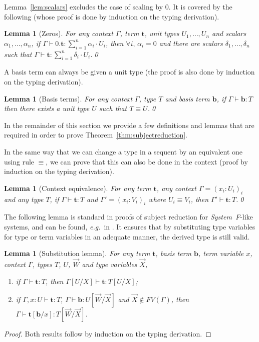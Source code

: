 \documentclass[colorlinks=true,linkcolor=black,urlcolor=black,citecolor=blue,submission,copyright,creativecommons]{eptcs}
\newtheorem{lemma}[theorem]{Lemma}
\newcommand{\eg}{\emph{e.g.}~}
\newcommand{\ve}[1]{\mathrm{\textbf{#1}}}
\newcommand{\type}{\colon\!}
\newcommand{\sui}[1]{\sum_{i=1}^{#1}}
\begin{document}
Lemma~\ref{lem:scalars} excludes the case of scaling by $0$. It is
covered by the following (whose proof is done by induction on the
typing derivation).

\begin{lemma}[Zeros]\label{lem:zeros}
For any context $\Gamma$, term $\ve t$, unit types $U_1,\ldots, U_n$ and scalars $\alpha_1,\ldots,\alpha_n$, if $\Gamma\vdash 0.\ve{t}\type\sui{n}\alpha_i\cdot U_i$, then $\forall i,\,\alpha_i=0$ and there are scalars $\delta_1,\ldots,\delta_n$ such that $\Gamma\vdash\ve{t}\type\sui{n}\delta_i\cdot U_i$.\qed
\end{lemma}

A basis term can always be given a unit type (the proof is also done by induction on the typing derivation).
\begin{lemma}[Basis terms]\label{lem:basevectors}
  For any context $\Gamma$, type $T$ and basis term $\ve{b}$, if
  $\Gamma\vdash\ve{b}\type T$ then there exists a unit type $U$ such
  that $T\equiv U$.\qed
\end{lemma}

In the remainder of this section we provide a few definitions and lemmas that are required in order to prove Theorem~\ref{thm:subjectreduction}.

In the same way that we can change a type in a sequent by an
equivalent one using rule $\equiv$, we can prove that this can also be
done in the context (proof by induction on the typing derivation).

\begin{lemma}[Context equivalence]\label{lem:contextequiv} For any
  term $\ve t$, any context $\Gamma\!=\!(x_i\type\! U_i)_i$ and any type
  $T$, if $\Gamma\vdash\ve{t}\type T$ and $\Gamma'=(x_i\type V_i)_i$
  where $U_i\equiv V_i$, then $\Gamma'\vdash\ve{t}\type T$.\qed
\end{lemma}

The following lemma is standard in proofs of subject reduction for
{\em System~F}-like systems, and can be found, \eg in
\cite[Ch. 4]{Barendregt92}. It
ensures that by substituting type variables for type or term variables
in an adequate manner, the derived type is still valid.

\begin{lemma}[Substitution lemma]\label{lem:substitution} For any term
  ${\ve t}$, basis term $\ve b$, term variable $x$, context $\Gamma$,
  types $T$, $U$, $\vec{W}$ and type variables $\vec{X}$,
  \begin{enumerate}
  \item\label{it:substitution1} if $\Gamma\vdash\ve{t}\type T$, then $\Gamma[U/X]\vdash\ve{t}\type T[U/X]$;
  \item\label{it:substitution2} if $\Gamma,{x}\type U\vdash\ve{t}\type T$, $\Gamma\vdash\ve{b}\type U[\vec{W}\!/\vec{X}]$ and $\vec{X}\notin FV(\Gamma)$, then $\Gamma\vdash\ve{t}[\ve{b}/x]\type T[\vec W\!/\vec X]$.
  \end{enumerate}
\end{lemma}
\begin{proof}
Both results follow by induction on the typing derivation.
\end{proof}
\end{document}
